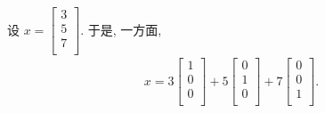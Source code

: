 \begin{example}
    设
    \(
    x = \begin{bmatrix}
        3 \\ 5 \\ 7 \\
    \end{bmatrix}.
    \)
    于是, 一方面,
    \begin{align*}
        x =
        3\begin{bmatrix}
             1 \\ 0 \\ 0 \\
         \end{bmatrix}
        + 5\begin{bmatrix}
               0 \\ 1 \\ 0 \\
           \end{bmatrix}
        + 7\begin{bmatrix}
               0 \\ 0 \\ 1 \\
           \end{bmatrix}.
    \end{align*}


\end{example}
